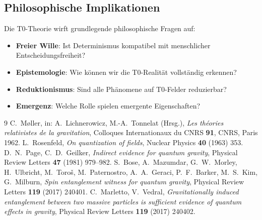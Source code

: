 	\subsection{Philosophische Implikationen}
	
	Die T0-Theorie wirft grundlegende philosophische Fragen auf:
	
	\begin{itemize}
		\item \textbf{Freier Wille}: Ist Determinismus kompatibel mit menschlicher Entscheidungsfreiheit?
		\item \textbf{Epistemologie}: Wie können wir die T0-Realität vollständig erkennen?
		\item \textbf{Reduktionismus}: Sind alle Phänomene auf T0-Felder reduzierbar?
		\item \textbf{Emergenz}: Welche Rolle spielen emergente Eigenschaften?
	\end{itemize}
	

	\begin{thebibliography}{9}
		 C.~M{\o}ller, in: A.~Lichnerowicz, M.-A.~Tonnelat (Hrsg.), \textit{Les th\'eories relativistes de la gravitation}, Colloques Internationaux du CNRS \textbf{91}, CNRS, Paris 1962.
		 L.~Rosenfeld, \textit{On quantization of fields}, Nuclear Physics \textbf{40} (1963) 353.
		 D.~N.~Page, C.~D.~Geilker, \textit{Indirect evidence for quantum gravity}, Physical Review Letters \textbf{47} (1981) 979--982.
		 S.~Bose, A.~Mazumdar, G.~W.~Morley, H.~Ulbricht, M.~Toro\v{s}, M.~Paternostro, A.~A.~Geraci, P.~F.~Barker, M.~S.~Kim, G.~Milburn, \textit{Spin entanglement witness for quantum gravity}, Physical Review Letters \textbf{119} (2017) 240401.
		 C.~Marletto, V.~Vedral, \textit{Gravitationally induced entanglement between two massive particles is sufficient evidence of quantum effects in gravity}, Physical Review Letters \textbf{119} (2017) 240402.
	\end{thebibliography}
